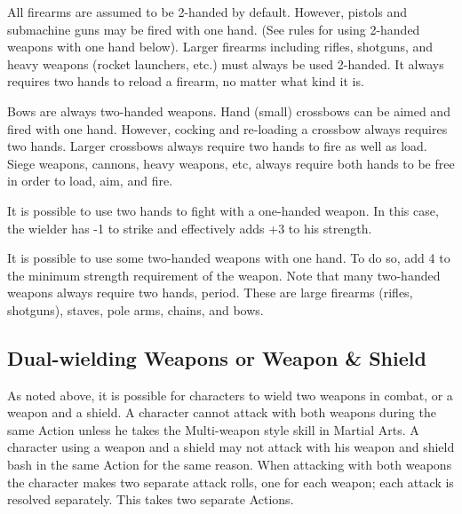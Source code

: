 \documentclass[twoside]{book}
\begin{document}
    {  
     All firearms are assumed to be 2-handed by default.
               However, pistols and submachine guns may be fired with one
               hand. (See rules for using 2-handed weapons with one hand
               below). Larger firearms including rifles, shotguns, and
               heavy weapons (rocket launchers, etc.) must always be used
               2-handed. It always requires two hands to reload a
               firearm, no matter what kind it is. 
    }
  
    {  
     Bows are always two-handed weapons. Hand (small)
               crossbows can be aimed and fired with one hand. However,
               cocking and re-loading a crossbow always requires two
               hands. Larger crossbows always require two hands to fire
               as well as load. Siege weapons, cannons, heavy weapons,
               etc, always require both hands to be free in order to
               load, aim, and fire. 
    }
  
    {  
     It is possible to use two hands to fight with a
               one-handed weapon. In this case, the wielder has -1 to
               strike and effectively adds +3 to his strength. 
    }
  
    {  
     It is possible to use some two-handed weapons with
               one hand. To do so, add 4 to the minimum strength
               requirement of the weapon. Note that many two-handed
               weapons always require two hands, period. These are large
               firearms (rifles, shotguns), staves, pole arms, chains,
               and bows. 
    }
  
    

\subsection{Dual-wielding Weapons or Weapon \& Shield}
    
    {  
     As noted above, it is possible for characters to
               wield two weapons in combat, or a weapon and a shield. A
               character cannot attack with both weapons during the same
               Action unless he takes the Multi-weapon style skill in
               Martial Arts. A character using a weapon and a shield may
               not attack with his weapon and shield bash in the same
               Action for the same reason. When attacking with both
               weapons the character makes two separate attack rolls, one
               for each weapon; each attack is resolved separately. This
               takes two separate Actions. 
    }
  
\end{document}

